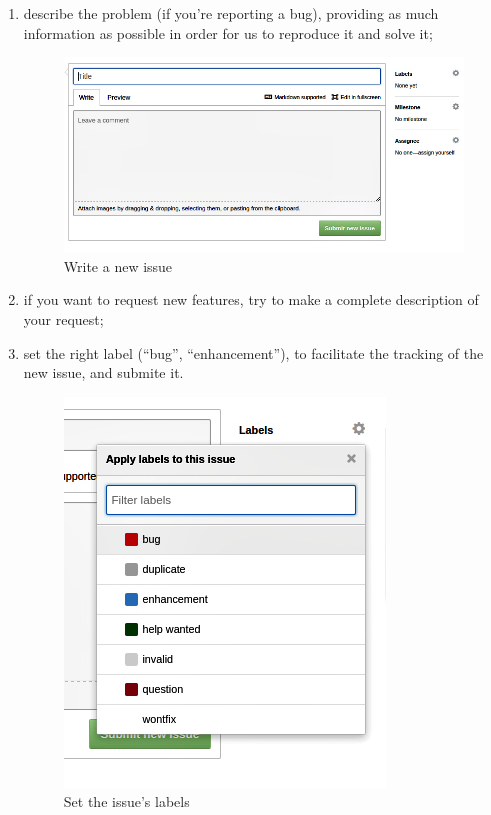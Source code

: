 \begin{enumerate}
	\item describe the problem (if you're reporting a bug), providing as much information as possible in order for us to reproduce it and solve it;
	\begin{figure}[H]
		\centering
		\includegraphics[scale=0.6]{Pics/TextIssue.jpg}
		\caption{Write a new issue}
	\end{figure}
	\item if you want to request new features, try to make a complete description of your request;
	\item set the right label (“bug”, “enhancement”), to facilitate the tracking of the new issue, and submite it.
	\begin{figure}[H]
		\centering
		\includegraphics[scale=0.6]{Pics/Labels.jpg}
		\caption{Set the issue's labels}
	\end{figure}
\end{enumerate}

